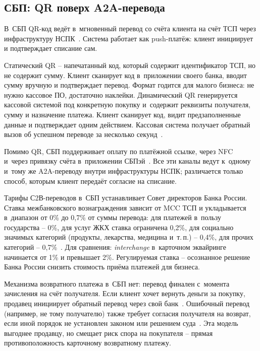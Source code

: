 \subsection*{СБП: QR поверх A2A-перевода}

В~СБП QR-код ведёт в~мгновенный перевод со счёта клиента на счёт
ТСП через инфраструктуру НСПК~\cite{sbp-main}. Система работает
как push-платёж: клиент инициирует и подтверждает списание сам.

Статический QR -- напечатанный код, который содержит
идентификатор ТСП, но не содержит сумму. Клиент сканирует код
в~приложении своего банка, вводит сумму вручную и подтверждает перевод.
Формат годится для малого бизнеса: не нужно кассовое ПО,
достаточно наклейки. Динамический QR генерируется кассовой системой
под конкретную покупку и~содержит реквизиты получателя, сумму
и назначение платежа. Клиент сканирует код, видит предзаполненные
данные и подтверждает одним действием. Кассовая система получает
обратный вызов об успешном переводе за несколько
секунд~\cite{sbp-faq-business}.

Помимо QR, СБП поддерживает оплату по платёжной ссылке, через NFC
и~через привязку счёта в~приложении
СБПэй~\cite{sbpay-app,sbp-main}. Все эти каналы ведут к~одному
и~тому же A2A-переводу внутри инфраструктуры НСПК; различается
только способ, которым клиент передаёт согласие на списание.

Тарифы С2В-переводов в~СБП устанавливает Совет директоров Банка
России. Ставка межбанковского вознаграждения зависит от MCC ТСП
и укладывается в~диапазон от 0\% до 0{,}7\% от суммы
перевода: для платежей в~пользу государства -- 0\%, для услуг ЖКХ
ставка ограничена 0{,}2\%, для социально значимых категорий
(продукты, лекарства, медицина и~т.\,п.) -- 0{,}4\%, для прочих
категорий -- 0{,}7\%~\cite{cbr-sbp-c2b-tariffs}. Для сравнения: \textit{interchange}
в~карточном эквайринге начинается от 1\% и превышает 2\%.
Регулируемая ставка -- осознанное решение Банка России снизить
стоимость приёма платежей для бизнеса.

Механизма возвратного платежа в~СБП нет: перевод финален с~момента зачисления
на счёт получателя. Если клиент хочет вернуть деньги за покупку,
продавец инициирует обратный перевод через свой
банк~\cite{sbp-faq-business}. Ошибочный перевод (например, не тому
получателю) также требует согласия получателя на возврат, если иной
порядок не установлен законом или решением
суда~\cite{cbr-sbp-faq-mistaken-transfer}. Эта модель выгоднее
продавцу, но смещает риск спора на покупателя -- прямая
противоположность карточному возвратному платежу.

